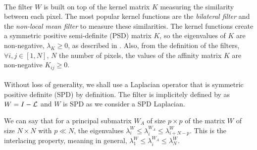 \paragraph{}
The filter \(W\) is built on top of the kernel matrix \(K\) measuring the similarity between each pixel.
The most popular kernel functions are the \textit{bilateral filter} \cite{bilateral_tomasi_1998} and the \textit{non-local mean filter} \cite{kervrann_nlm_2006} to measure these similarities.
The kernel functions create a symmetric positive semi-definite (PSD) matrix \(K\), so the eigenvalues of \(K\) are non-negative, \(\lambda_K \ge 0\), as described in \cite{talebi_fast_2016}.
Also, from the definition of the filters, \(\forall i, j \in [1, N]\), \(N\) the number of pixels, the values of the affinity matrix \(K\) are non-negative \(K_{ij} \ge 0\).

\paragraph{}
Without loss of generality, we shall use a Laplacian operator that is symmetric positive definite (SPD) by definition.
The filter is implicitely defined by \cite{modern_tour_2013} as \(W = I - \operatorname{\mathcal{L}}\) and \(W\) is SPD as we consider a SPD Laplacian.

We can say that for a principal submatrix \(W_A\) of size \(p \times p\) of the matrix \(W\) of size \(N \times N\) with \(p \ll N\), the eigenvalues \(\lambda^W_i \le \lambda^{W_A}_i \le \lambda^W_{i+N-p}\).
This is the interlacing property, meaning in general, \(\lambda^W_1 \le \lambda^{W_A}_i \le \lambda^W_N\).

